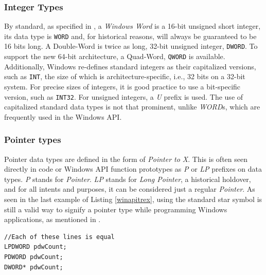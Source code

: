 \subsubsection{Integer Types}
\label{winIntegers}
By standard, as specified in \cite{WinConventions}, a \textit{Windows Word} is a 16-bit unsigned short integer, its data type is \lstinline{WORD} and, for historical reasons, will always be guaranteed to be 16 bits long. A Double-Word is twice as long, 32-bit unsigned integer, \lstinline{DWORD}. To support the new 64-bit architecture, a Quad-Word, \lstinline{QWORD} is available. Additionally, Windows re-defines standard integers as their capitalized versions, such as \lstinline{INT},  the size of which is architecture-specific, i.e., 32 bits on a 32-bit system. For precise sizes of integers, it is good practice to use a bit-specific version, such as \lstinline{INT32}. For unsigned integers, a \textit{U} prefix is used. The use of capitalized standard data types is not that prominent, unlike \textit{WORD}s, which are frequently used in the Windows API.

\subsubsection{Pointer types}
Pointer data types are defined in the form of \textit{Pointer to X}. This is often seen directly in code or Windows API function prototypes as \textit{P} or \textit{LP} prefixes on data types. \textit{P} stands for \textit{Pointer}. \textit{LP} stands for \textit{Long Pointer}, a historical holdover, and for all intents and purposes, it can be considered just a regular \textit{Pointer}. As seen in the last example of Listing \ref{winapitrex}, using the standard star symbol is still a valid way to signify a pointer type while programming Windows applications, as mentioned in \cite{WinConventions}.
\begin{lstlisting}[caption={An example of declaring a pointer to a double-word}, label=winapitrex]
//Each of these lines is equal
LPDWORD pdwCount;
PDWORD pdwCount;
DWORD* pdwCount;
\end{lstlisting}

